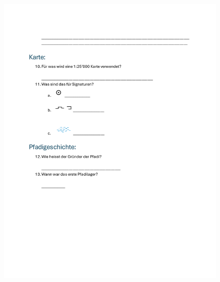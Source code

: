 \begin{figure}[!h]
    \begin{minipage}[t]{0.49\textwidth}
        \centering
        \includegraphics[width=\textwidth]{Picture/seite3.pdf}
    \end{minipage}
    \begin{minipage}[t]{0.49\textwidth}
        \centering

\end{minipage}
\end{figure}
